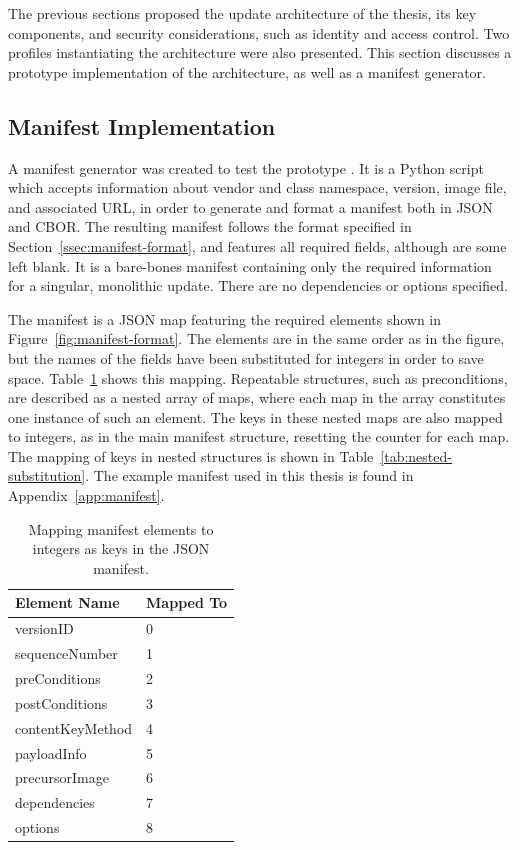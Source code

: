 \documentclass[0-thesis.tex]{subfiles}
\begin{document}
The previous sections proposed the update architecture of the thesis, its key components,
and security considerations, such as identity and access control. Two profiles
instantiating the architecture were also presented. This section discusses a prototype
implementation of the architecture, as well as a manifest generator. 

\subsection{Manifest Implementation}
\label{ssec:manifest-implementation}
A manifest generator was created to test the prototype \parencite{manifest-generator}. It
is a Python script which accepts information about vendor and class namespace, version,
image file, and associated URL, in order to generate and format a manifest both in JSON
and CBOR. The resulting manifest follows the format specified in
Section~\ref{ssec:manifest-format}, and features all required fields, although are some
left blank. It is a bare-bones manifest containing only the required information for a
singular, monolithic update. There are no dependencies or options specified.

The manifest is a JSON map featuring the required elements shown in
Figure~\ref{fig:manifest-format}. The elements are in the same order as in the figure, but
the names of the fields have been substituted for integers in order to save space.
Table~\ref{tab:manifest-substitution} shows this mapping. Repeatable structures, such as
preconditions, are described as a nested array of maps, where each map in the array
constitutes one instance of such an element. The keys in these nested maps are also mapped
to integers, as in the main manifest structure, resetting the counter for each map. The
mapping of keys in nested structures is shown in Table~\ref{tab:nested-substitution}. The
example manifest used in this thesis is found in Appendix~\ref{app:manifest}. 

\begin{longtable}[]{@{}ll@{}}
    \caption{Mapping manifest elements to integers as keys in the JSON manifest.}
    \label{tab:manifest-substitution}\\
    \toprule
    Element Name & Mapped To\tabularnewline
    \midrule
    \endhead
    versionID & 0\tabularnewline
    sequenceNumber & 1\tabularnewline
    preConditions & 2\tabularnewline
    postConditions & 3\tabularnewline
    contentKeyMethod & 4\tabularnewline
    payloadInfo & 5\tabularnewline
    precursorImage & 6\tabularnewline
    dependencies & 7\tabularnewline
    options & 8\tabularnewline
    \bottomrule
\end{longtable}
\end{document}

